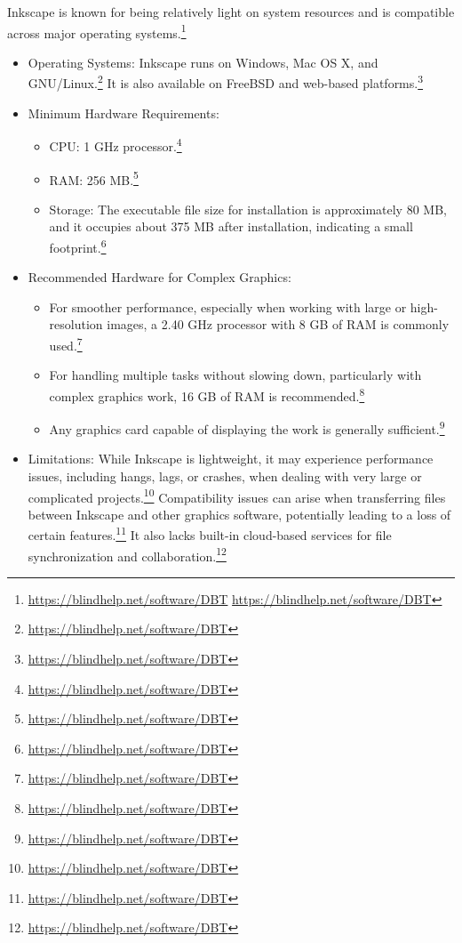 Inkscape is known for being relatively light on system resources and is compatible across major operating systems.\footnote{\url{https://blindhelp.net/software/DBT} \url{https://blindhelp.net/software/DBT}}

\begin{itemize}
    \item Operating Systems: Inkscape runs on Windows, Mac OS X, and GNU/Linux.\footnote{\url{https://blindhelp.net/software/DBT}} It is also available on FreeBSD and web-based platforms.\footnote{\url{https://blindhelp.net/software/DBT}}
    \item Minimum Hardware Requirements:
    \begin{itemize}
        \item CPU: 1 GHz processor.\footnote{\url{https://blindhelp.net/software/DBT}}
        \item RAM: 256 MB.\footnote{\url{https://blindhelp.net/software/DBT}}
        \item Storage: The executable file size for installation is approximately 80 MB, and it occupies about 375 MB after installation, indicating a small footprint.\footnote{\url{https://blindhelp.net/software/DBT}}
    \end{itemize}
    \item Recommended Hardware for Complex Graphics:
    \begin{itemize}
        \item For smoother performance, especially when working with large or high-resolution images, a 2.40 GHz processor with 8 GB of RAM is commonly used.\footnote{\url{https://blindhelp.net/software/DBT}}
        \item For handling multiple tasks without slowing down, particularly with complex graphics work, 16 GB of RAM is recommended.\footnote{\url{https://blindhelp.net/software/DBT}}
        \item Any graphics card capable of displaying the work is generally sufficient.\footnote{\url{https://blindhelp.net/software/DBT}}
    \end{itemize}
    \item Limitations: While Inkscape is lightweight, it may experience performance issues, including hangs, lags, or crashes, when dealing with very large or complicated projects.\footnote{\url{https://blindhelp.net/software/DBT}} Compatibility issues can arise when transferring files between Inkscape and other graphics software, potentially leading to a loss of certain features.\footnote{\url{https://blindhelp.net/software/DBT}} It also lacks built-in cloud-based services for file synchronization and collaboration.\footnote{\url{https://blindhelp.net/software/DBT}}
\end{itemize}

